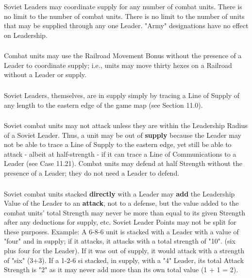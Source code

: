 \subsubsection{} Soviet Leaders may coordinate supply for any number of combat units. There is no limit to the number of combat units. There is no limit to the number of units that may be supplied through any one Leader. "Army" designations have no effect on Leadership.

\subsubsection{} Combat units may use the Railroad Movement Bonus without the presence of a Leader to coordinate supply; i.e., units may move thirty hexes on a Railroad without a Leader or supply.

\subsubsection{} Soviet Leaders, themselves, are in supply simply by tracing a Line of Supply of any length to the eastern edge of the game map (see Section 11.0).

\subsubsection{} Soviet combat units may not attack unless they are within the Leadership Radius of a Soviet Leader. Thus, a unit may be out of \textbf{supply} because the Leader may not be able to trace a Line of Supply to the eastern edge, yet still be able to attack - albeit at half-strength - if it can trace a Line of Communications to a Leader (see Case 11.21). Combat units may defend at half Strength without the presence of a Leader; they do not need a Leader to defend.

\subsubsection{} Soviet combat units stacked \textbf{directly} with a Leader may \textbf{add} the Leadership Value of the Leader to an \textbf{attack}, not to a defense, but the value added to the combat units' total Strength may never be more than equal to its given Strength after any deductions for supply, etc. Soviet Leader Points may not be split for these purposes. Example: A 6-8-6 unit is stacked with a Leader with a value of "four" and in supply; if it attacks, it attacks with a total strength of "10". (six plus four for the Leader). If it was out of supply, it would attack with a strength of "six" (3+3). If a 1-2-6 si stacked, in supply, with a "4" Leader, its total Attack Strength is "2" as it may never add more than its own total value (1 + 1 = 2).

